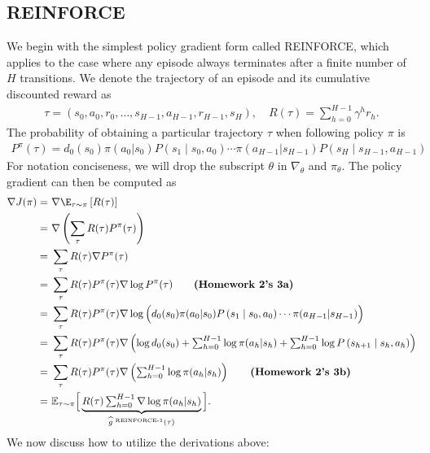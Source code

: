 \subsection{REINFORCE}
We begin with the simplest policy gradient form called REINFORCE, which applies to the case where any episode always terminates after a finite number of $H$ transitions. We denote the trajectory of an episode and its cumulative discounted reward as 
\begin{align*}
    \tau = (s_0, a_0, r_0, \ldots, s_{H-1}, a_{H-1}, r_{H-1}, s_H),\quad
    R(\tau) = \textstyle \sum_{h=0}^{H-1}\gamma^hr_h
    .
\end{align*}
The probability of obtaining a particular trajectory $\tau$ when following policy $\pi$ is
\begin{align*}
    P^\pi(\tau) = d_0(s_0) \pi(a_0 | s_0) P\left(s_1 \mid s_0, a_0\right) \cdots \pi(a_{H-1} | s_{H-1})  P\left(s_{H} \mid s_{H-1}, a_{H-1}\right)
\end{align*}
For notation conciseness, we will drop the subscript $\theta$ in $\nabla_\theta$ and $\pi_\theta$.
The policy gradient can then be computed as 
\begin{align}
\nabla J(\pi) =&~ \nabla \E_{\tau\sim\pi}\left[R(\tau)\right] \nonumber\\
=&~ \nabla \left(\sum_{\tau} R(\tau) P^\pi(\tau)\right)\nonumber\\
=&~\sum_\tau R(\tau) \nabla P^\pi(\tau) \nonumber\\
=&~\sum_\tau R(\tau) P^\pi(\tau) \nabla \log P^\pi(\tau)  \qquad\text{\bf(Homework 2's 3a)}\nonumber\\
=&~\sum_\tau R(\tau) P^\pi(\tau) \nabla \log \Big(d_0(s_0) \pi(a_0 | s_0) P\left(s_1 \mid s_0, a_0\right) \cdots \pi(a_{H-1} | s_{H-1})\Big) \nonumber\\
=&~\sum_\tau R(\tau) P^\pi(\tau) \textstyle\nabla\left(\log d_0(s_0)+\sum_{h=0}^{H-1} \log \pi(a_h | s_h)+\sum_{h=0}^{H-1} \log P\left(s_{h+1} \mid s_h, a_h\right)\right) \nonumber\\
=&~\sum_\tau R(\tau) P^\pi(\tau) \textstyle\nabla\left(\sum_{h=0}^{H-1} \log \pi(a_h | s_h)\right)
\qquad\text{\bf(Homework 2's 3b)}
\label{eq:PG_REINFORCE}\\ 
=&~\mathbb{E}_{\tau \sim \pi}\Big[\underbrace{R(\tau) \textstyle\sum_{h=0}^{H-1} \nabla \log \pi(a_h | s_h)}_{\widehat{g}^{\text{ REINFORCE-1}}(\tau)}\Big]
\label{eq:REINFORCE-1}
.
\end{align}
We now discuss how to utilize the derivations above:
